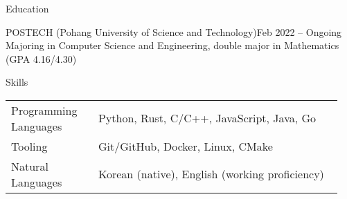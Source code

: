 \documentclass{resume}
\begin{document}
\begin{res-section}{Education}
  \begin{res-subsection}{POSTECH (Pohang University of Science and Technology)}{Feb 2022 -- Ongoing}
    Majoring in Computer Science and Engineering, double major in Mathematics (GPA 4.16/4.30)
  \end{res-subsection}
\end{res-section}

\begin{res-section}{Skills}
  \begin{tabular}{p{0.25\linewidth}p{0.7\linewidth}}
    Programming Languages
      & Python, Rust, C/C++, JavaScript, Java, Go \\
    Tooling
      & Git/GitHub, Docker, Linux, CMake \\
    Natural Languages
      & Korean (native), English (working proficiency)
  \end{tabular}
\end{res-section}
\end{document}
